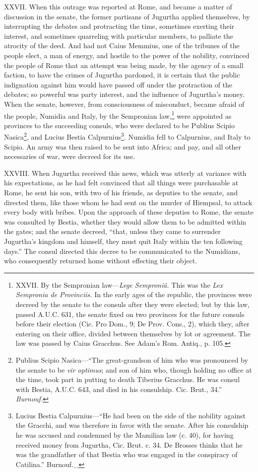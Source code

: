XXVII. When this outrage was reported at Rome, and became a matter of
discussion in the senate, the former partisans of Jugurtha applied
themselves, by interrupting the debates and protracting the time,
sometimes exerting their interest, and sometimes quarreling with
particular members, to palliate the atrocity of the deed. And had not
Caius Memmius, one of the tribunes of the people elect, a man of
energy, and hostile to the power of the nobility, convinced the people
of Rome that an attempt was being made, by the agency of a small
faction, to have the crimes of Jugurtha pardoned, it is certain that
the public indignation against him would have passed off under the
protraction of the debates; so powerful was party interest, and the
influence of Jugurtha's money. When the senate, however, from
consciousness of misconduct, became afraid of the people, Numidia and
Italy, by the Sempronian law,\footnote{XXVII. By the Sempronian law—\emph{Lege Semproniâ.} This was
the \emph{Lex Sempronia de Provinciis.} In the early ages of the republic,
the provinces were decreed by the senate to the consuls after they
were elected; but by this law, passed A.U.C. 631, the senate fixed on
two provinces for the future consuls before their election (Cic. Pro
Dom., 9; De Prov. Cons., 2), which they, after entering on their
office, divided between themselves by lot or agreement. The law was
passed by Caius Gracchus. See Adam's Rom. Antiq., p. 105.} were appointed as provinces to the
succeeding consuls, who were declared to be Publius Scipio Nasica\footnote{Publius Scipio Nasica—``The great-grandson of him who was
pronounced by the senate to be \emph{vir optimus}; and son of him who,
though holding no office at the time, took part in putting to death
Tiberius Gracchus. He was consul with Bestia, A.U.C. 643, and died in
his consulship. Cic. Brut., 34.'' \emph{Burnouf.}},
and Lucius Bestia Calpurnius\footnote{Lucius Bestia Calpurnius—``He had been on the side of the
nobility against the Gracchi, and was therefore in favor with the
senate. After his consulship he was accused and condemned by the
Mamilian law (c. 40), for having received money from Jugurtha, Cic.
Brut. c. 34. De Brosses thinks that he was the grandfather of that
Bestia who was engaged in the conspiracy of Catilina.'' Burnouf.\_}. Numidia fell to Calpurnius, and Italy
to Scipio. An army was then raised to be sent into Africa; and pay, and
all other necessaries of war, were decreed for its use.

XXVIII. When Jugurtha received this news, which was utterly at
variance with his expectations, as he had felt convinced that all
things were purchasable at Rome, he sent his son, with two of his
friends, as deputies to the senate, and directed them, like those whom
he had sent on the murder of Hiempsal, to attack every body with
bribes. Upon the approach of these deputies to Rome, the senate was
consulted by Bestia, whether they would allow them to be admitted
within the gates; and the senate decreed, ``that, unless they came to
surrender Jugurtha's kingdom and himself, they must quit Italy within
the ten following days.'' The consul directed this decree to be
communicated to the Numidians, who consequently returned home without
effecting their object.

